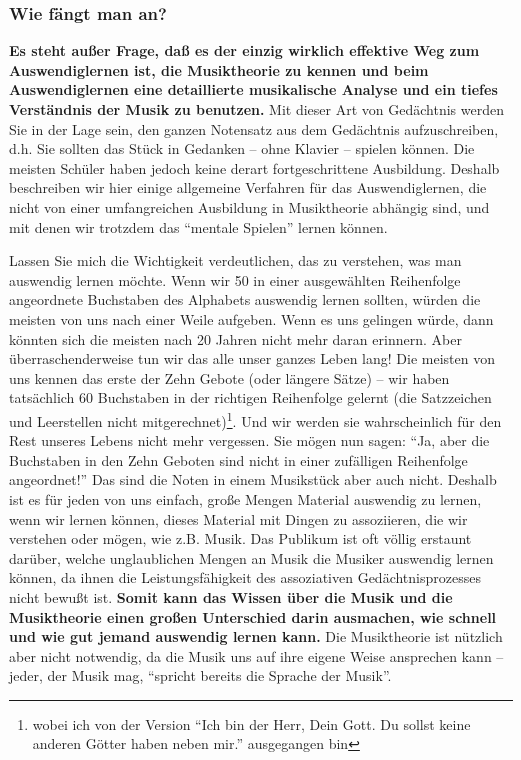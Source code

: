 
\subsubsection{Wie fängt man an?}
\label{c1iii6e}

\textbf{Es steht außer Frage, daß es der einzig wirklich effektive Weg zum Auswendiglernen ist, die Musiktheorie zu kennen und beim Auswendiglernen eine detaillierte musikalische Analyse und ein tiefes Verständnis der Musik zu benutzen.}
Mit dieser Art von Gedächtnis werden Sie in der Lage sein, den ganzen Notensatz aus dem Gedächtnis aufzuschreiben, d.h. Sie sollten das Stück in Gedanken -- ohne Klavier -- spielen können.
Die meisten Schüler haben jedoch keine derart fortgeschrittene Ausbildung.
Deshalb beschreiben wir hier einige allgemeine Verfahren für das Auswendiglernen, die nicht von einer umfangreichen Ausbildung in Musiktheorie abhängig sind, und mit denen wir trotzdem das \enquote{mentale Spielen} lernen können.

Lassen Sie mich die Wichtigkeit verdeutlichen, das zu verstehen, was man auswendig lernen möchte.
Wenn wir 50 in einer ausgewählten Reihenfolge angeordnete Buchstaben des Alphabets auswendig lernen sollten, würden die meisten von uns nach einer Weile aufgeben.
Wenn es uns gelingen würde, dann könnten sich die meisten nach 20 Jahren nicht mehr daran erinnern.
Aber überraschenderweise tun wir das alle unser ganzes Leben lang!
Die meisten von uns kennen das erste der Zehn Gebote (oder längere Sätze) -- wir haben tatsächlich 60 Buchstaben in der richtigen Reihenfolge gelernt (die Satzzeichen und Leerstellen nicht mitgerechnet)\footnote{wobei ich von der Version \enquote{Ich bin der Herr, Dein Gott. Du sollst keine anderen Götter haben neben mir.} ausgegangen bin}.
Und wir werden sie wahrscheinlich für den Rest unseres Lebens nicht mehr vergessen.
Sie mögen nun sagen: \enquote{Ja, aber die Buchstaben in den Zehn Geboten sind nicht in einer zufälligen Reihenfolge angeordnet!}
Das sind die Noten in einem Musikstück aber auch nicht.
Deshalb ist es für jeden von uns einfach, große Mengen Material auswendig zu lernen, wenn wir lernen können, dieses Material mit Dingen zu assoziieren, die wir verstehen oder mögen, wie z.B. Musik.
Das Publikum ist oft völlig erstaunt darüber, welche unglaublichen Mengen an Musik die Musiker auswendig lernen können, da ihnen die Leistungsfähigkeit des assoziativen Gedächtnisprozesses nicht bewußt ist.
\textbf{Somit kann das Wissen über die Musik und die Musiktheorie einen großen Unterschied darin ausmachen, wie schnell und wie gut jemand auswendig lernen kann.}
Die Musiktheorie ist nützlich aber nicht notwendig, da die Musik uns auf ihre eigene Weise ansprechen kann -- jeder, der Musik mag, \enquote{spricht bereits die Sprache der Musik}.

